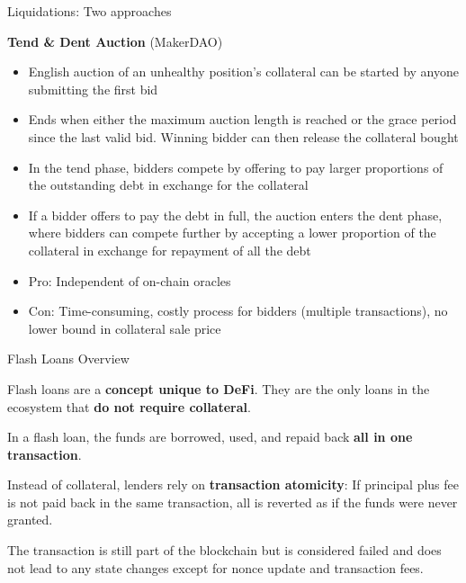 \documentclass[handout]{beamer}
\begin{document}
\begin{frame}{Liquidations: Two approaches }

\vspace{1em}

\textbf{Tend \& Dent Auction} (MakerDAO)

\begin{itemize}
\item English auction of an unhealthy position’s collateral can be started by anyone submitting the first bid
\item Ends when either the maximum auction length is reached or the grace period since the last valid bid. Winning bidder can then release the collateral bought


\item In the tend phase, bidders compete by offering to pay larger proportions of the outstanding debt in exchange for the collateral
\item If a bidder offers to pay the debt in full, the auction enters the dent phase, where bidders can compete further by accepting a lower proportion of the collateral in exchange for repayment of all the debt

\item Pro: Independent of on-chain oracles

\item Con: Time-consuming, costly process for bidders (multiple transactions), no lower bound in collateral sale price
\end{itemize}

	
\end{frame}


\begin{frame}{Flash Loans Overview}

Flash loans are a \textbf{concept unique to DeFi}. They are the only loans in the ecosystem that \textbf{do not require collateral}.

\vspace{1em}

In a flash loan, the funds are borrowed, used, and repaid back \textbf{all in one transaction}.

\vspace{1em}

Instead of collateral, lenders rely on \textbf{transaction atomicity}: If principal plus fee is not paid back in the same transaction, all is reverted as if the funds were never granted.

\vspace{1em}

The transaction is still part of the blockchain but is considered failed and does not lead to any state changes except for nonce update and transaction fees. 



	
\end{frame}
\end{document}
